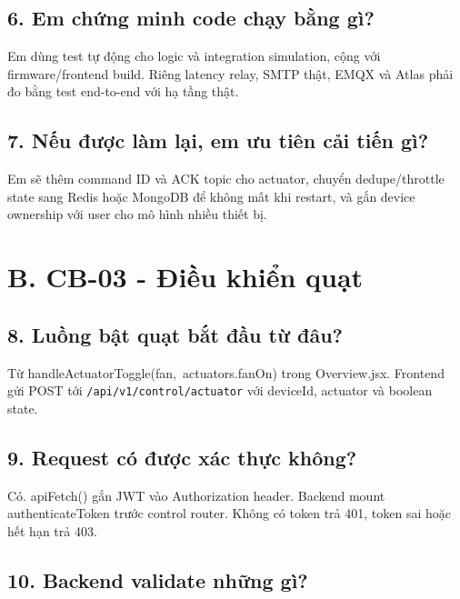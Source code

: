 \documentclass[11pt,oneside,openany]{book}
\renewcommand{\texttt}[1]{{\ttfamily\small #1}}
\begin{document}
\subsection{6. Em chứng minh code chạy bằng
gì?}\label{6-em-chux1ee9ng-minh-code-chux1ea1y-bux1eb1ng-guxec}

Em dùng test tự động cho logic và integration simulation, cộng với
firmware/frontend build. Riêng latency relay, SMTP thật, EMQX và Atlas
phải đo bằng test end-to-end với hạ tầng thật.

\subsection{7. Nếu được làm lại, em ưu tiên cải tiến
gì?}\label{7-nux1ebfu-ux111ux1b0ux1ee3c-luxe0m-lux1ea1i-em-ux1b0u-tiuxean-cux1ea3i-tiux1ebfn-guxec}

Em sẽ thêm command ID và ACK topic cho actuator, chuyển dedupe/throttle
state sang Redis hoặc MongoDB để không mất khi restart, và gắn device
ownership với user cho mô hình nhiều thiết bị.

\section{B. CB-03 - Điều khiển
quạt}\label{b-cb-03---ux111iux1ec1u-khiux1ec3n-quux1ea1t}

\subsection{8. Luồng bật quạt bắt đầu từ
đâu?}\label{8-luux1ed3ng-bux1eadt-quux1ea1t-bux1eaft-ux111ux1ea7u-tux1eeb-ux111uxe2u}

Từ
\texttt{handleActuatorToggle(\textquotesingle{}fan\textquotesingle{},\ actuators.fanOn)}
trong \texttt{Overview.jsx}. Frontend gửi POST tới
\nolinkurl{/api/v1/control/actuator} với deviceId, actuator và boolean
state.

\subsection{9. Request có được xác thực
không?}\label{9-request-cuxf3-ux111ux1b0ux1ee3c-xuxe1c-thux1ef1c-khuxf4ng}

Có. \texttt{apiFetch()} gắn JWT vào Authorization header. Backend mount
\texttt{authenticateToken} trước control router. Không có token trả 401,
token sai hoặc hết hạn trả 403.

\subsection{10. Backend validate những
gì?}\label{10-backend-validate-nhux1eefng-guxec}
\end{document}
